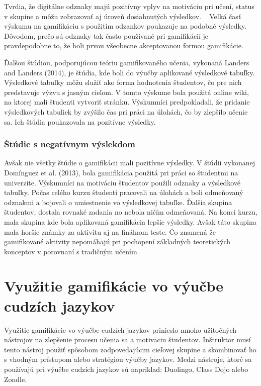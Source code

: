 \documentclass[10pt,oneside,slovak,a4paper]{article}
\begin{document}
Tvrdia, že digitálne odznaky majú pozitívny vplyv na motiváciu pri učení, status v skupine a môžu zobrazovať aj úroveň dosiahnutých výsledkov. ~\cite{gibson2015digital} Veľká časť výskumu na gamifikáciu s použitím odzankov poukazuje na podobné výsledky. Dôvodom, prečo sú odznaky tak často používané pri gamifikácií je pravdepodobne to, že boli prvou všeobecne akceptovanou formou gamifikácie. ~\cite{garland2015gamification}

Ďalšou štúdiou, podporujúcou teóriu gamifikovaného učenia, vykonaná Landers and Landers (2014), je štúdia, kde boli do výučby aplikované výsledkové tabuľky. Výsledkové tabuľky môžu služiť ako forma hodnotenia študentov, čo pre nich predstavuje výzvu s jasným cieľom. V tomto výskume bola použitá online wiki, na ktorej mali študenti vytvoriť stránku. Výskumníci predpokladali, že pridanie výsledkových tabuliek by zvýšilo čas pri práci na úlohách, čo by zlepšilo učenie sa. Ich štúdia poukazovala na pozitívne výsledky.
~\cite{garland2015gamification}

\subsubsection{Štúdie s negatívnym výslekdom} \label{negat}
Avšak nie všetky štúdie o gamifikácii mali pozitívne výsledky. V štúdii vykonanej Domínguez et al. (2013), bola gamifikácia použitá pri práci so študentmi na univerzite. Výskumníci na motiváciu študentov použili odznaky a výsledkové tabuľky. Počas celého kurzu študenti pracovali na úlohách a boli odmeňovaný odznakmi a bojovali o umiestnenie vo výsledkovej tabuľke. Ďalšia skupina študentov, dostala rovnaké zadania no nebola ničím odmeňovaná. Na konci kurzu, mala skupina kde bola aplikovaná gamifikácia lepšie výsledky. Avšak táto skupina mala horšie známky za aktivitu aj na finálnom teste. Čo znamená že gamifikované aktivity nepomáhajú pri pochopení základných teoretických konceptov v porovnaní s tradičným učením. ~\cite{dominguez2013gamifying}
\section{Využitie gamifikácie vo výučbe cudzích jazykov} \label{use}
Využitie gamifikácie vo výučbe cudzích jazykov prinieslo mnoho užitočných nástrojov na zlepšenie procesu učenia sa a motivaciu študentov. Inštruktor musí tento nástroj použiť spôsobom zodpovedajúcim cieľovej skupine a skombinovať ho s vhodným prístupom alebo stratégiou výučby jazykov. Medzi nástroje, ktoré sa používajú pri výučbe cudzích jazykov sú napriklad: Duolingo, Class Dojo alebo Zondle. ~\cite{flores2015using}
\end{document}
